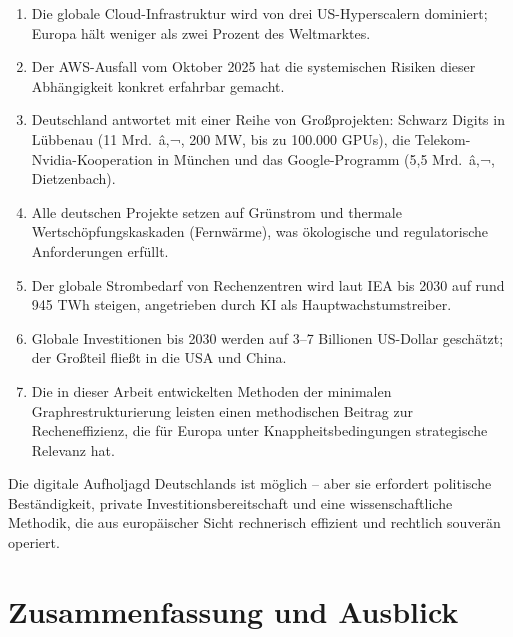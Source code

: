 ﻿\documentclass[12pt, a4paper, openany]{report}
\begin{document}
\begin{enumerate}[label=(\roman*)]
	\item Die globale Cloud-Infrastruktur wird von drei US-Hyperscalern
	dominiert; Europa hält weniger als zwei Prozent des Weltmarktes.
	\item Der AWS-Ausfall vom Oktober 2025 hat die systemischen Risiken
	dieser Abhängigkeit konkret erfahrbar gemacht.
	\item Deutschland antwortet mit einer Reihe von Großprojekten: Schwarz
	Digits in Lübbenau (11 Mrd.\ â‚¬, 200 MW, bis zu 100.000 GPUs), die
	Telekom-Nvidia-Kooperation in München und das Google-Programm
	(5,5 Mrd.\ â‚¬, Dietzenbach).
	\item Alle deutschen Projekte setzen auf Grünstrom und thermale
	Wertschöpfungskaskaden (Fernwärme), was ökologische und
	regulatorische Anforderungen erfüllt.
	\item Der globale Strombedarf von Rechenzentren wird laut IEA bis 2030
	auf rund 945 TWh steigen, angetrieben durch KI als Hauptwachstumstreiber.
	\item Globale Investitionen bis 2030 werden auf 3--7 Billionen
	US-Dollar geschätzt; der Großteil fließt in die USA und China.
	\item Die in dieser Arbeit entwickelten Methoden der minimalen
	Graphrestrukturierung leisten einen methodischen Beitrag zur
	Recheneffizienz, die für Europa unter Knappheitsbedingungen
	strategische Relevanz hat.
\end{enumerate}

\noindent
Die digitale Aufholjagd Deutschlands ist möglich -- aber sie erfordert
politische Beständigkeit, private Investitionsbereitschaft und eine
wissenschaftliche Methodik, die aus europäischer Sicht rechnerisch
effizient und rechtlich souverän operiert.

\chapter{Zusammenfassung und Ausblick}
\label{sec:conclusion}
\end{document}
